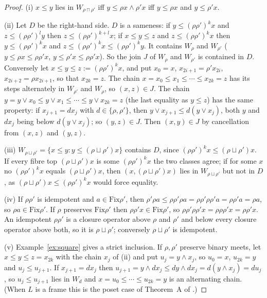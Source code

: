 \documentclass[11pt]{amsart}
\theoremstyle{definition}
\newcommand{\Fix}{\mathrm{Fix}}
\begin{document}
\begin{proof}
(i) $x\le y$ lies in $W_{\rho\sqcap\rho'}$ iff $y\le\rho x\wedge\rho'x$ iff
$y\le\rho x$ and $y\le\rho'x$.

(ii) Let $D$ be the right-hand side. $D$ is a sameness: if $y\le(\rho
\rho')^kx$ and $z\le(\rho\rho')^ly$ then $z\le(\rho\rho')^{k+l}x$; if
$x\le y\le z$ and $z\le(\rho\rho')^kx$ then $y\le(\rho\rho')^kx$ and
$z\le(\rho\rho')^kx\le(\rho\rho')^ky$. It contains $W_\rho$ and
$W_{\rho'}$ ($y\le\rho x\le\rho\rho'x$, $y\le\rho'x\le\rho\rho'x$). So the
join $J$ of $W_\rho$ and $W_{\rho'}$ is contained in $D$. Conversely let
$x\le y\le z:=(\rho\rho')^kx$, and put $x_0=x$, $x_{2i+1}=\rho'x_{2i}$,
$x_{2i+2}=\rho x_{2i+1}$, so that $x_{2k}=z$. The chain $x=x_0\le
x_1\le\cdots\le x_{2k}=z$ has its steps alternately in $W_{\rho'}$ and
$W_\rho$, so $(x,z)\in J$. The chain $y=y\vee x_0\le y\vee x_1\le\cdots\le
y\vee x_{2k}=z$ (the last equality as $y\le z$) has the same property: if
$x_{j+1}=dx_j$ with $d\in\{\rho,\rho'\}$, then $y\vee x_{j+1}\le d(y\vee
x_j)$, both $y$ and $dx_j$ being below $d(y\vee x_j)$; so $(y,z)\in J$.
Then $(x,y)\in J$ by cancellation from $(x,z)$ and $(y,z)$.

(iii) $W_{\rho\sqcup\rho'}=\{x\le y:y\le(\rho\sqcup\rho')x\}$ contains $D$,
since $(\rho\rho')^kx\le(\rho\sqcup\rho')x$. If every fibre top
$(\rho\sqcup\rho')x$ is some $(\rho\rho')^kx$ the two classes agree;
if for some $x$ no $(\rho\rho')^kx$ equals $(\rho\sqcup\rho')x$, then
$(x,(\rho\sqcup\rho')x)$ lies in $W_{\rho\sqcup\rho'}$ but not in $D$,
as $(\rho\sqcup\rho')x\le(\rho\rho')^kx$ would force equality.

(iv) If $\rho\rho'$ is idempotent and $a\in\Fix\rho'$, then
$\rho'\rho a\le\rho\rho'\rho a=\rho\rho'\rho\rho'a=\rho\rho'a=\rho a$, so
$\rho a\in\Fix\rho'$. If $\rho$ preserves $\Fix\rho'$ then
$\rho\rho'x\in\Fix\rho'$, so $\rho\rho'\rho\rho'x=\rho\rho\rho'x=\rho\rho'x$.
An idempotent $\rho\rho'$ is a closure operator above $\rho$ and $\rho'$ and
below every closure operator above both, so it is $\rho\sqcup\rho'$;
conversely $\rho\sqcup\rho'$ is idempotent.

(v) Example~\ref{ex:square} gives a strict inclusion. If $\rho,\rho'$
preserve binary meets, let $x\le y\le z=x_{2k}$ with the chain $x_j$ of
(ii) and put $u_j=y\wedge x_j$, so $u_0=x$, $u_{2k}=y$ and $u_j\le
u_{j+1}$. If $x_{j+1}=dx_j$ then $u_{j+1}=y\wedge dx_j\le dy\wedge
dx_j=d(y\wedge x_j)=du_j$, so $u_j\le u_{j+1}$ lies in $W_d$ and
$x=u_0\le\cdots\le u_{2k}=y$ is an alternating chain. (When $L$ is a
frame this is the poset case of Theorem~A of \cite{Fijoin}.)
\end{proof}
\end{document}
